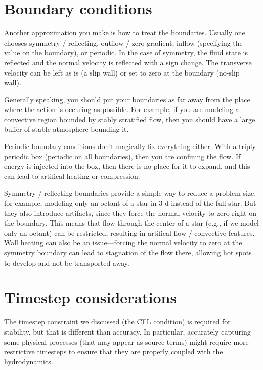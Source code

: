 \section{Boundary conditions}

Another approximation you make is how to treat the boundaries.
Usually one chooses symmetry / reflecting, outflow / zero-gradient,
inflow (specifying the value on the boundary), or periodic.  In the
case of symmetry, the fluid state is reflected and the normal velocity
is reflected with a sign change.  The transverse velocity can be left
as is (a slip wall) or set to zero at the boundary (no-slip wall).  

Generally speaking, you should put your boundaries as far away from
the place where the action is occuring as possible.  For example,
if you are modeling a convective region bounded by stably stratified
flow, then you should have a large buffer of stable atmosphere
bounding it.

Periodic boundary conditions don't magically fix everything either.
With a triply-periodic box (periodic on all boundaries), then you are
confining the flow.  If energy is injected into the box, then there is
no place for it to expand, and this can lead to artifical heating or
compression.

Symmetry / reflecting boundaries provide a simple way to reduce a
problem size, for example, modeling only an octant of a star in 3-d
instead of the full star.  But they also introduce artifacts, since
they force the normal velocity to zero right on the boundary.  This
means that flow through the center of a star (e.g., if we model only
an octant) can be restricted, resulting in artifical flow / convective
features.  Wall heating can also be an issue---forcing the normal
velocity to zero at the symmetry boundary can lead to stagnation of
the flow there, allowing hot spots to develop and not be transported
away.







\section{Timestep considerations}

The timestep constraint we discussed (the CFL condition) is required
for stability, but that is different than accuracy.  In particular,
accurately capturing some physical processes (that may appear as
source terms) might require more restrictive timesteps to ensure that they 
are properly coupled with the hydrodynamics.  

